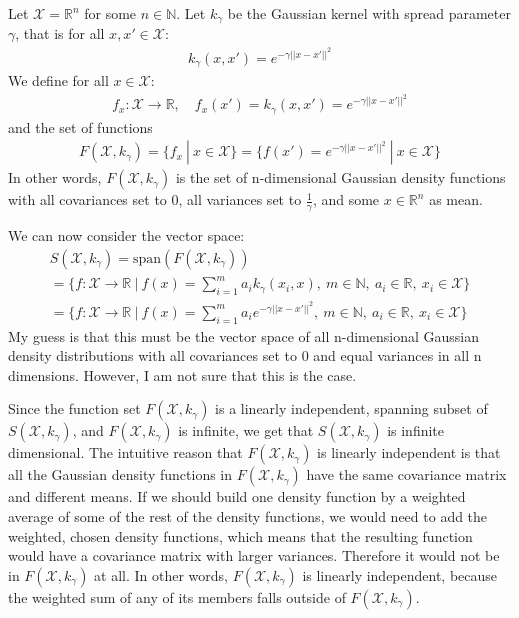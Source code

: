 \documentclass[12pt]{article}
\begin{document}
Let $\mathcal{X} = \mathbb{R}^n$ for some $n\in \mathbb{N}$. Let $k_\gamma$ be the Gaussian kernel with spread parameter $\gamma$, that is for all $x,x' \in \mathcal{X}$:
\begin{align}
k_\gamma(x,x')=e^{-\gamma||x-x'||^2}
\end{align}
We define for all $x\in \mathcal{X}$:
\begin{align}
f_x: \mathcal{X}\to \mathbb{R}, \quad f_x(x') = k_\gamma(x,x') = e^{-\gamma||x-x'||^2}
\end{align}
and the set of functions
\begin{align}
F(\mathcal{X}, k_\gamma) = \{f_x\ |\ x\in \mathcal{X} \} = \{f(x') = e^{-\gamma||x-x'||^2}\ |\ x\in \mathcal{X} \}
\end{align}
In other words, $F(\mathcal{X},k_\gamma)$ is the set of n-dimensional Gaussian density functions with all covariances set to 0, all variances set to $\frac{1}{\gamma}$, and some $x\in \mathbb{R}^n$ as mean.

We can now consider the vector space:
\begin{align}
S(\mathcal{X},k_\gamma) = \text{span}(F(\mathcal{X}, k_\gamma)) \\ = 
\{f: \mathcal{X}\to \mathbb{R}\ |\ f(x) =  \sum_{i=1}^m a_i k_\gamma(x_i,x),\ m\in \mathbb{N},\ a_i\in \mathbb{R},\ x_i \in \mathcal{X} \} \\ =
\{f: \mathcal{X}\to \mathbb{R}\ |\ f(x) =  \sum_{i=1}^m a_i e^{-\gamma||x-x'||^2},\ m\in \mathbb{N},\ a_i\in \mathbb{R},\ x_i \in \mathcal{X} \} 
\end{align}
My guess is that this must be the vector space of all n-dimensional Gaussian density distributions with all covariances set to 0 and equal variances in all n dimensions. However, I am not sure that this is the case.

Since the function set $F(\mathcal{X},k_\gamma)$ is a linearly independent, spanning subset of $S(\mathcal{X},k_\gamma)$, and $F(\mathcal{X},k_\gamma)$ is infinite, we get that $S(\mathcal{X},k_\gamma)$ is infinite dimensional. The intuitive reason that $F(\mathcal{X},k_\gamma)$ is linearly independent is that all the Gaussian density functions in $F(\mathcal{X},k_\gamma)$ have the same covariance matrix and different means. If we should build one density function by a weighted average of some of the rest of the density functions, we would need to add the weighted, chosen density functions, which means that the resulting function would have a covariance matrix with larger variances. Therefore it would not be in $F(\mathcal{X},k_\gamma)$ at all. In other words, $F(\mathcal{X},k_\gamma)$ is linearly independent, because the weighted sum of any of its members falls outside of $F(\mathcal{X},k_\gamma)$.
\end{document}
